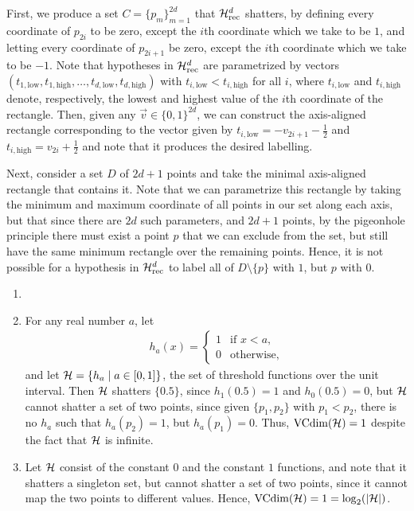 \begin{ex}
  First, we produce a set $C=\{p_m\}_{m=1}^{2d}$ that $\mathcal{H}_{\text{rec}}^d$
  shatters, by defining every coordinate of $p_{2i}$ to be zero, except the
  $i$th coordinate which we take to be $1$, and letting every coordinate of
  ${p_{2i+1}}$ be zero, except the $i$th coordinate which we take to be $-1$.
  Note that hypotheses in $\mathcal{H}_{\text{rec}}^d$ are parametrized by vectors
  $(t_{1,\text{low}},t_{1,\text{high}},\ldots,t_{d,\text{low}},t_{d,\text{high}})$
  with $t_{i,\text{low}}<t_{i,\text{high}}$ for all $i$, where
  $t_{i,\text{low}}$ and $t_{i,\text{high}}$ denote, respectively, the lowest
  and highest value of the $i$th coordinate of the rectangle. Then, given any
  $\vec{v}\in\{0, 1\}^{2d}$, we can construct the axis-aligned rectangle
  corresponding to the vector given by $t_{i,\text{low}}=-v_{2i+1}-\frac{1}{2}$
  and $t_{i,\text{high}}=v_{2i}+\frac{1}{2}$ and note that it produces the
  desired labelling.

  Next, consider a set $D$ of $2d+1$ points and take the minimal axis-aligned
  rectangle that contains it. Note that we can parametrize this rectangle by
  taking the minimum and maximum coordinate of all points in our set along each
  axis, but that since there are $2d$ such parameters, and $2d+1$ points, by the
  pigeonhole principle there must exist a point $p$ that we can exclude from the
  set, but still have the same minimum rectangle over the remaining points.
  Hence, it is not possible for a hypothesis in $\mathcal{H}_{\text{rec}}^d$ to label all
  of $D\setminus\{p\}$ with $1$, but $p$ with $0$.
\end{ex}

\begin{ex}
\end{ex}

\begin{ex}
  \begin{enumerate}
    \item[]
    \item For any real number $a$, let
          \begin{align*}
            h_a(x)=\begin{cases}
              1 & \text{if $x < a$}, \\
              0 & \text{otherwise},
            \end{cases}
          \end{align*}
          and let $\mathcal{H}=\{h_a \mid a\in [0, 1] \}$, the set of threshold
          functions over the unit interval. Then $\mathcal{H}$ shatters
          $\{0.5\}$, since $h_1(0.5)=1$ and $h_0(0.5)=0$, but $\mathcal{H}$
          cannot shatter a set of two points, since given $\{p_1, p_2\}$ with
          $p_1 < p_2$, there is no $h_a$ such that $h_a(p_2) = 1$, but
          $h_a(p_1)=0$. Thus, $\operatorname{VCdim}(\mathcal{H})=1$ despite the fact that $\mathcal{H}$ is
          infinite.
    \item Let $\mathcal{H}$ consist of the constant $0$ and the constant $1$ functions,
          and note that it shatters a singleton set, but cannot shatter a set of
          two points, since it cannot map the two points to different values.
          Hence, $\operatorname{VCdim}(\mathcal{H})=1=\log_2(|\mathcal{H}|)$.
  \end{enumerate}
\end{ex}

